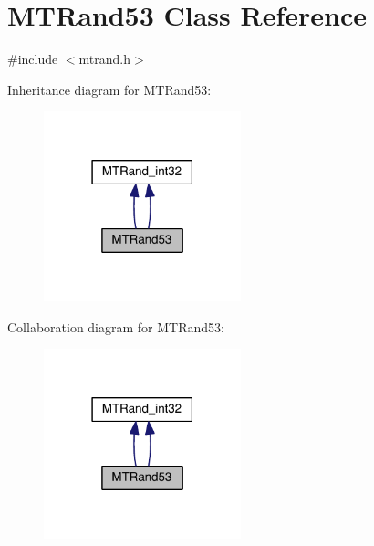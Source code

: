 \hypertarget{a00017}{\section{M\-T\-Rand53 Class Reference}
\label{a00017}
}


{\ttfamily \#include $<$mtrand.\-h$>$}



Inheritance diagram for M\-T\-Rand53\-:
\nopagebreak
\begin{figure}[H]
\begin{center}
\leavevmode
\includegraphics[width=162pt]{a00213}
\end{center}
\end{figure}


Collaboration diagram for M\-T\-Rand53\-:
\nopagebreak
\begin{figure}[H]
\begin{center}
\leavevmode
\includegraphics[width=162pt]{a00214}
\end{center}
\end{figure}
